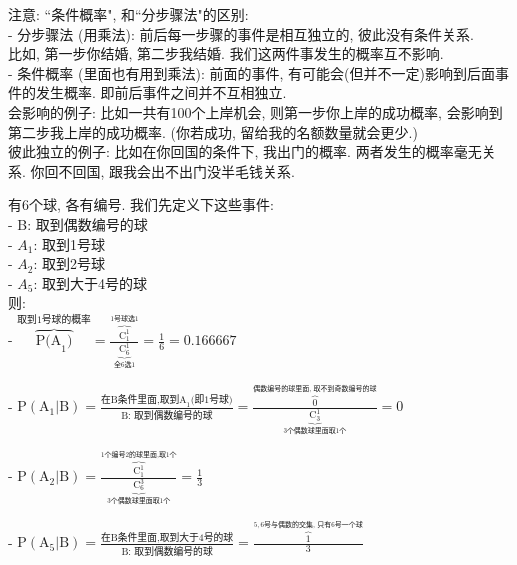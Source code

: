 \documentclass[UTF8]{ctexart}
\begin{document}
	
	注意: ``条件概率", 和``分步骤法"的区别: \\
	- 分步骤法 (用乘法): 前后每一步骤的事件是相互独立的, 彼此没有条件关系.  \\
	比如, 第一步你结婚, 第二步我结婚. 我们这两件事发生的概率互不影响. \\
	
	- 条件概率 (里面也有用到乘法): 前面的事件, 有可能会(但并不一定)影响到后面事件的发生概率. 即前后事件之间并不互相独立.  \\
	会影响的例子: 比如一共有100个上岸机会, 则第一步你上岸的成功概率, 会影响到第二步我上岸的成功概率. (你若成功, 留给我的名额数量就会更少.) \\
	彼此独立的例子: 比如在你回国的条件下, 我出门的概率. 两者发生的概率毫无关系. 你回不回国, 跟我会出不出门没半毛钱关系. \\

		
	
	
	\begin{myEnvSample}
		有6个球, 各有编号.  我们先定义下这些事件: \\
		- B: 取到偶数编号的球 \\
		- $A_1$: 取到1号球 \\
		- $A_2$: 取到2号球 \\
		- $A_5$: 取到大于4号的球 \\
		
		则: \\
		- $
		\overset{\text{取到1号球的概率}}{\overbrace{\text{P(A}_1\text{)}}}=\frac{\overset{1\text{号球选}1}{\overbrace{\text{C}_{1}^{1}}}}{\underset{\text{全6选}1}{\underbrace{\text{C}_{6}^{1}}}}=\frac{1}{6}=0.166667
		$
		
		- $
		\text{P}\left( \text{A}_1|\text{B} \right) =\frac{\text{在B条件里面,取到A}_1\text{(即1号球)}}{\text{B:\ 取到偶数编号的球}}=\frac{\overset{\text{偶数编号的球里面,\ 取不到奇数编号的球}}{\overbrace{0}}}{\underset{3\text{个偶数球里面取1个}}{\underbrace{\text{C}_{3}^{1}}}}=0
		$
		
		- $
		\text{P}\left( \text{A}_2|\text{B} \right) =\frac{\overset{1\text{个编号2的球里面,取1个}}{\overbrace{\text{C}_{1}^{1}}}}{\underset{3\text{个偶数球里面取1个}}{\underbrace{\text{C}_{6}^{3}}}}=\frac{1}{3}
		$
		
		- $
		\text{P}\left( \text{A}_5|\text{B} \right) =\frac{\text{在B条件里面,取到大于4号的球}}{\text{B:\ 取到偶数编号的球}}=\frac{\overset{5,6\text{号与偶数的交集,\ 只有6号一个球}}{\overbrace{1}}}{3}
		$
			
	\end{myEnvSample}
	
\end{document}
